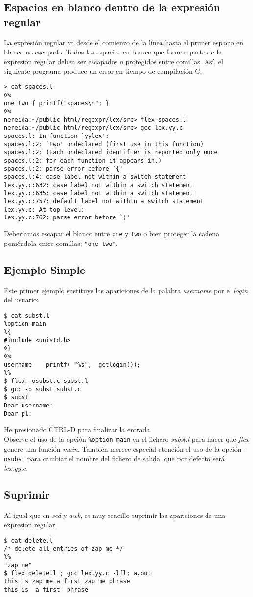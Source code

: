 \subsection{Espacios en blanco dentro de la expresión regular}
\label{section:blancos}
La expresión regular va desde el comienzo de la línea hasta el primer espacio en blanco 
no escapado. Todos los espacios en blanco que formen parte de la 
expresión regular 
deben ser escapados o protegidos entre comillas. Así, el siguiente
programa produce un error en tiempo de compilación C:
\begin{verbatim}
> cat spaces.l
%%
one two { printf("spaces\n"; }
%%
nereida:~/public_html/regexpr/lex/src> flex spaces.l
nereida:~/public_html/regexpr/lex/src> gcc lex.yy.c
spaces.l: In function `yylex':
spaces.l:2: `two' undeclared (first use in this function)
spaces.l:2: (Each undeclared identifier is reported only once
spaces.l:2: for each function it appears in.)
spaces.l:2: parse error before `{'
spaces.l:4: case label not within a switch statement
lex.yy.c:632: case label not within a switch statement
lex.yy.c:635: case label not within a switch statement
lex.yy.c:757: default label not within a switch statement
lex.yy.c: At top level:
lex.yy.c:762: parse error before `}'
\end{verbatim}
Deberíamos escapar el blanco entre \verb|one| y \verb|two| o bien
proteger la cadena poniéndola entre comillas: \verb|"one two"|.

\subsection{Ejemplo Simple}
\label{section:ejemplosimple}
Este primer ejemplo sustituye las apariciones de la palabra 
\emph{username} por el \emph{login} del usuario:
\begin{verbatim}
$ cat subst.l
%option main
%{
#include <unistd.h>
%}
%%
username    printf( "%s",  getlogin());
%%
$ flex -osubst.c subst.l
$ gcc -o subst subst.c
$ subst
Dear username:
Dear pl:
\end{verbatim}
He presionado CTRL-D para finalizar la entrada.\\
Observe el uso de la opci\'on \verb|%option main| en el fichero
\emph{subst.l} para hacer que \emph{flex} genere una funci\'on
\emph{main}. Tambi\'en merece especial
atenci\'on el uso de la opci\'on  \verb|-osubst| para cambiar el
nombre del fichero de salida, que por defecto ser\'a \emph{lex.yy.c}.

\subsection{Suprimir}
\label{section:suprimir}
Al igual que en \emph{sed} y \emph{awk}, es muy sencillo
suprimir las apariciones de una expresi\'on regular. 
\begin{verbatim}
$ cat delete.l
/* delete all entries of zap me */
%%
"zap me"
$ flex delete.l ; gcc lex.yy.c -lfl; a.out
this is zap me a first zap me phrase
this is  a first  phrase 
\end{verbatim}

